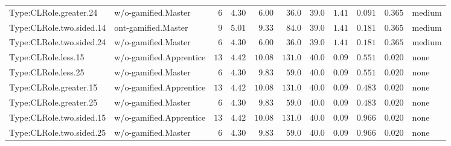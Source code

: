 \documentclass[6pt,a4paper]{article}
\begin{document}
{\begin{longtable}{llrrrrrrrrl}
Type:CLRole.greater.24&w/o-gamified.Master&$ 6$&$4.30$&$ 6.00$&$ 36.0$&$ 39.0$&$ 1.41$&$0.091$&$0.365$&medium\tabularnewline
Type:CLRole.two.sided.14&ont-gamified.Master&$ 9$&$5.01$&$ 9.33$&$ 84.0$&$ 39.0$&$ 1.41$&$0.181$&$0.365$&medium\tabularnewline
Type:CLRole.two.sided.24&w/o-gamified.Master&$ 6$&$4.30$&$ 6.00$&$ 36.0$&$ 39.0$&$ 1.41$&$0.181$&$0.365$&medium\tabularnewline
Type:CLRole.less.15&w/o-gamified.Apprentice&$13$&$4.42$&$10.08$&$131.0$&$ 40.0$&$ 0.09$&$0.551$&$0.020$&none\tabularnewline
Type:CLRole.less.25&w/o-gamified.Master&$ 6$&$4.30$&$ 9.83$&$ 59.0$&$ 40.0$&$ 0.09$&$0.551$&$0.020$&none\tabularnewline
Type:CLRole.greater.15&w/o-gamified.Apprentice&$13$&$4.42$&$10.08$&$131.0$&$ 40.0$&$ 0.09$&$0.483$&$0.020$&none\tabularnewline
Type:CLRole.greater.25&w/o-gamified.Master&$ 6$&$4.30$&$ 9.83$&$ 59.0$&$ 40.0$&$ 0.09$&$0.483$&$0.020$&none\tabularnewline
\newpage
Type:CLRole.two.sided.15&w/o-gamified.Apprentice&$13$&$4.42$&$10.08$&$131.0$&$ 40.0$&$ 0.09$&$0.966$&$0.020$&none\tabularnewline
Type:CLRole.two.sided.25&w/o-gamified.Master&$ 6$&$4.30$&$ 9.83$&$ 59.0$&$ 40.0$&$ 0.09$&$0.966$&$0.020$&none\tabularnewline
\hline
\end{longtable}}
\end{document}
